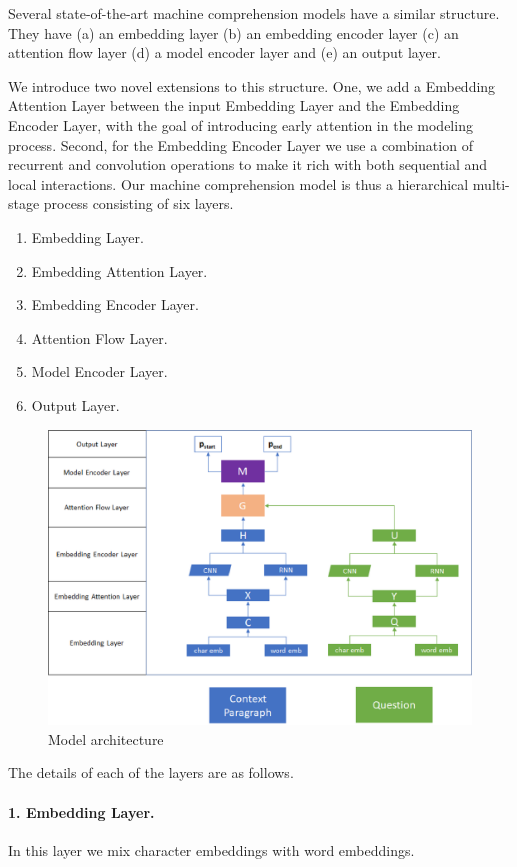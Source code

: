 Several state-of-the-art machine comprehension models have a similar structure. They have (a) an embedding layer (b) an embedding encoder layer (c) an attention flow layer (d) a model encoder layer and (e) an output layer. 

We introduce two novel extensions to this structure.  One, we add a Embedding Attention Layer between the input Embedding Layer and the Embedding Encoder Layer, with the goal of introducing early attention in the modeling process. Second, for the Embedding Encoder Layer we use a combination of recurrent and convolution operations to make it rich with both sequential and local interactions. Our machine comprehension model is thus a hierarchical multi-stage process consisting of six layers. 

\begin{enumerate}
\item Embedding Layer. 
\item Embedding Attention Layer.
\item Embedding Encoder Layer.
\item Attention Flow Layer.
\item Model Encoder Layer.
\item Output Layer.
\end{enumerate}

\begin{figure}[h!]
\centering
	\includegraphics[width=12cm]{Figs4Paper/Model2.eps}
  \caption{Model architecture}
  \label{fig:modelarchitecture}
\end{figure}

The details of each of the layers are as follows.

\paragraph{1. Embedding Layer.} In this layer we mix character embeddings with word embeddings. 


